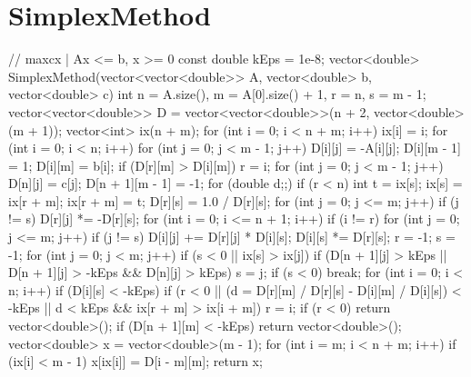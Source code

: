\documentclass[12pt, titlepage]{article}
\begin{document}
\section{SimplexMethod}
\begin{cppcode}
// max{cx | Ax <= b, x >= 0}
const double kEps = 1e-8;
vector<double> SimplexMethod(vector<vector<double>> A, vector<double> b, vector<double> c) {
               int n = A.size(), m = A[0].size() + 1, r = n, s = m - 1;
	vector<vector<double>> D = vector<vector<double>>(n + 2, vector<double>(m + 1));
	vector<int> ix(n + m);
	for (int i = 0; i < n + m; i++) ix[i] = i;
	for (int i = 0; i < n; i++) {
		for (int j = 0; j < m - 1; j++) D[i][j] = -A[i][j];
		D[i][m - 1] = 1;
		D[i][m] = b[i];
		if (D[r][m] > D[i][m]) r = i;
	}
	for (int j = 0; j < m - 1; j++) D[n][j] = c[j];
	D[n + 1][m - 1] = -1;
	for (double d;;) {
		if (r < n) {
			int t = ix[s]; ix[s] = ix[r + m]; ix[r + m] = t;
			D[r][s] = 1.0 / D[r][s];
			for (int j = 0; j <= m; j++) if (j != s) D[r][j] *= -D[r][s];
			for (int i = 0; i <= n + 1; i++) if (i != r) {
				for (int j = 0; j <= m; j++) if (j != s) D[i][j] += D[r][j] * D[i][s];
				D[i][s] *= D[r][s];
			}
		}
		r = -1; s = -1;
		for (int j = 0; j < m; j++) if (s < 0 || ix[s] > ix[j]) {
			if (D[n + 1][j] > kEps || D[n + 1][j] > -kEps && D[n][j] > kEps) s = j;
		}
		if (s < 0) break;
		for (int i = 0; i < n; i++) if (D[i][s] < -kEps) {
			if (r < 0 || (d = D[r][m] / D[r][s] - D[i][m] / D[i][s]) < -kEps
				|| d < kEps && ix[r + m] > ix[i + m]) r = i;
		}
		if (r < 0) return vector<double>();
	}
	if (D[n + 1][m] < -kEps) return vector<double>();
	vector<double> x = vector<double>(m - 1);
	for (int i = m; i < n + m; i++) if (ix[i] < m - 1) x[ix[i]] = D[i - m][m];
	return x;
}
\end{cppcode}
\end{document}
